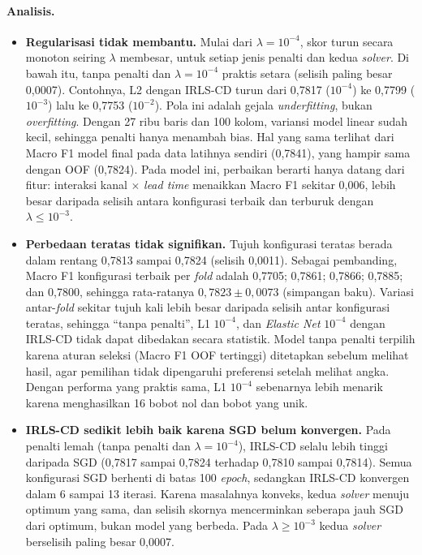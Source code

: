 \paragraph{Analisis.}
\begin{itemize}
	\item \textbf{Regularisasi tidak membantu.} Mulai dari $\lambda = 10^{-4}$, skor turun secara monoton seiring $\lambda$ membesar, untuk setiap jenis penalti dan kedua \textit{solver}. Di bawah itu, tanpa penalti dan $\lambda = 10^{-4}$ praktis setara (selisih paling besar 0,0007). Contohnya, L2 dengan IRLS-CD turun dari 0,7817 ($10^{-4}$) ke 0,7799 ($10^{-3}$) lalu ke 0,7753 ($10^{-2}$). Pola ini adalah gejala \textit{underfitting}, bukan \textit{overfitting}. Dengan 27 ribu baris dan 100 kolom, variansi model linear sudah kecil, sehingga penalti hanya menambah bias. Hal yang sama terlihat dari Macro F1 model final pada data latihnya sendiri (0,7841), yang hampir sama dengan OOF (0,7824). Pada model ini, perbaikan berarti hanya datang dari fitur: interaksi kanal $\times$ \textit{lead time} menaikkan Macro F1 sekitar 0,006, lebih besar daripada selisih antara konfigurasi terbaik dan terburuk dengan $\lambda \le 10^{-3}$.
	\item \textbf{Perbedaan teratas tidak signifikan.} Tujuh konfigurasi teratas berada dalam rentang 0,7813 sampai 0,7824 (selisih 0,0011). Sebagai pembanding, Macro F1 konfigurasi terbaik per \textit{fold} adalah 0,7705; 0,7861; 0,7866; 0,7885; dan 0,7800, sehingga rata-ratanya $0{,}7823 \pm 0{,}0073$ (simpangan baku). Variasi antar-\textit{fold} sekitar tujuh kali lebih besar daripada selisih antar konfigurasi teratas, sehingga ``tanpa penalti'', L1 $10^{-4}$, dan \textit{Elastic Net} $10^{-4}$ dengan IRLS-CD tidak dapat dibedakan secara statistik. Model tanpa penalti terpilih karena aturan seleksi (Macro F1 OOF tertinggi) ditetapkan sebelum melihat hasil, agar pemilihan tidak dipengaruhi preferensi setelah melihat angka. Dengan performa yang praktis sama, L1 $10^{-4}$ sebenarnya lebih menarik karena menghasilkan 16 bobot nol dan bobot yang unik.
	\item \textbf{IRLS-CD sedikit lebih baik karena SGD belum konvergen.} Pada penalti lemah (tanpa penalti dan $\lambda = 10^{-4}$), IRLS-CD selalu lebih tinggi daripada SGD (0,7817 sampai 0,7824 terhadap 0,7810 sampai 0,7814). Semua konfigurasi SGD berhenti di batas 100 \textit{epoch}, sedangkan IRLS-CD konvergen dalam 6 sampai 13 iterasi. Karena masalahnya konveks, kedua \textit{solver} menuju optimum yang sama, dan selisih skornya mencerminkan seberapa jauh SGD dari optimum, bukan model yang berbeda. Pada $\lambda \ge 10^{-3}$ kedua \textit{solver} berselisih paling besar 0,0007.

\end{itemize}
